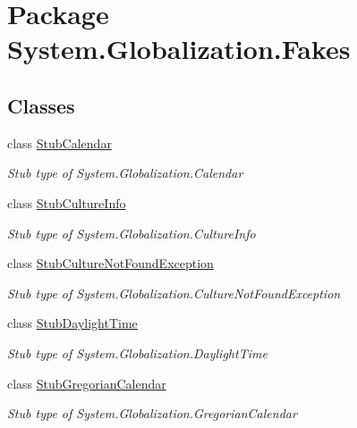 \hypertarget{namespace_system_1_1_globalization_1_1_fakes}{\section{Package System.\-Globalization.\-Fakes}
\label{namespace_system_1_1_globalization_1_1_fakes}
}
\subsection*{Classes}
\begin{DoxyCompactItemize}
\item 
class \hyperlink{class_system_1_1_globalization_1_1_fakes_1_1_stub_calendar}{Stub\-Calendar}
\begin{DoxyCompactList}\small\item\em Stub type of System.\-Globalization.\-Calendar\end{DoxyCompactList}\item 
class \hyperlink{class_system_1_1_globalization_1_1_fakes_1_1_stub_culture_info}{Stub\-Culture\-Info}
\begin{DoxyCompactList}\small\item\em Stub type of System.\-Globalization.\-Culture\-Info\end{DoxyCompactList}\item 
class \hyperlink{class_system_1_1_globalization_1_1_fakes_1_1_stub_culture_not_found_exception}{Stub\-Culture\-Not\-Found\-Exception}
\begin{DoxyCompactList}\small\item\em Stub type of System.\-Globalization.\-Culture\-Not\-Found\-Exception\end{DoxyCompactList}\item 
class \hyperlink{class_system_1_1_globalization_1_1_fakes_1_1_stub_daylight_time}{Stub\-Daylight\-Time}
\begin{DoxyCompactList}\small\item\em Stub type of System.\-Globalization.\-Daylight\-Time\end{DoxyCompactList}\item 
class \hyperlink{class_system_1_1_globalization_1_1_fakes_1_1_stub_gregorian_calendar}{Stub\-Gregorian\-Calendar}
\begin{DoxyCompactList}\small\item\em Stub type of System.\-Globalization.\-Gregorian\-Calendar\end{DoxyCompactList}\item 

\end{DoxyCompactItemize}
